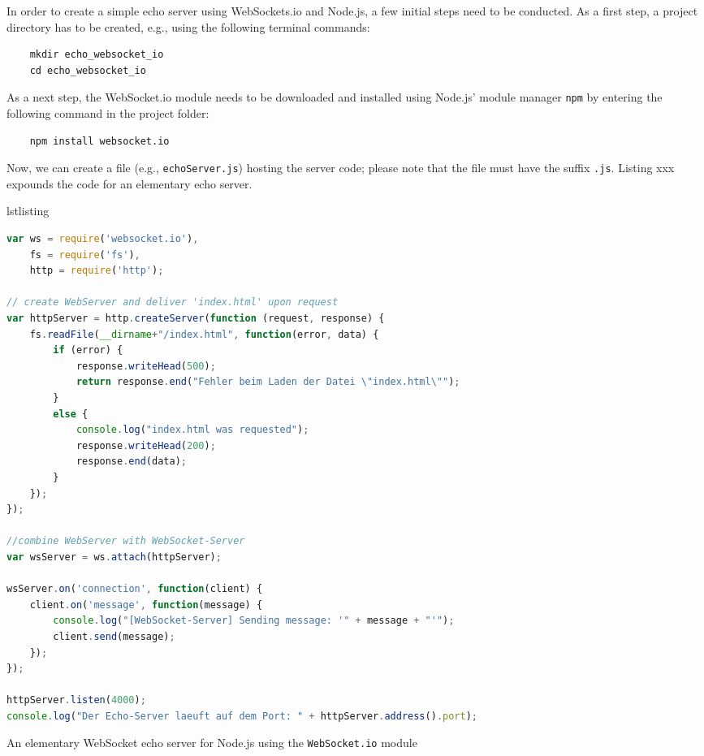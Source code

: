 \documentclass[a4paper, justified, notoc]{tufte-handout} %
\makeatletter
\newenvironment{listing}[1][htbp] %
  {\ifvmode\else\unskip\fi\begin{@tufte@float}[#1]{lstlisting}{}}
  {\end{@tufte@float} } %
\makeatother
\begin{document}
In order to create a simple echo server using WebSockets.io and Node.js, a few initial steps need to be conducted.
As a first step, a project directory has to be created, e.g., using the following terminal commands:
\begin{Verbatim}
	mkdir echo_websocket_io
	cd echo_websocket_io
\end{Verbatim} 
As a next step, the WebSocket.io module needs to be downloaded and installed using Node.js' module manager \texttt{npm} by entering the following command in the project folder:
\begin{Verbatim}
	npm install websocket.io
\end{Verbatim}
Now, we can create a file (e.g., \texttt{echoServer.js}) hosting the server code; please note that the file must have the suffix \texttt{.js}. Listing xxx expounds the code for an elementary echo server.
\begin{listing}%
\begin{lstlisting}[language=JavaScript]
var ws = require('websocket.io'),
    fs = require('fs'),
    http = require('http');

// create WebServer and deliver 'index.html' upon request
var httpServer = http.createServer(function (request, response) {
    fs.readFile(__dirname+"/index.html", function(error, data) {
        if (error) {
            response.writeHead(500);
            return response.end("Fehler beim Laden der Datei \"index.html\"");
        } 
        else {
            console.log("index.html was requested");
            response.writeHead(200);
            response.end(data);
        }
    }); 
});

//combine WebServer with WebSocket-Server
var wsServer = ws.attach(httpServer);

wsServer.on('connection', function(client) {
    client.on('message', function(message) {
        console.log("[WebSocket-Server] Sending message: '" + message + "'");
        client.send(message);
    });
});

httpServer.listen(4000);
console.log("Der Echo-Server laeuft auf dem Port: " + httpServer.address().port);
\end{lstlisting}
	\caption{An elementary WebSocket echo server for Node.js using the \texttt{WebSocket.io} module} 
	\label{websocket_io_server}
\end{listing}
\end{document}
